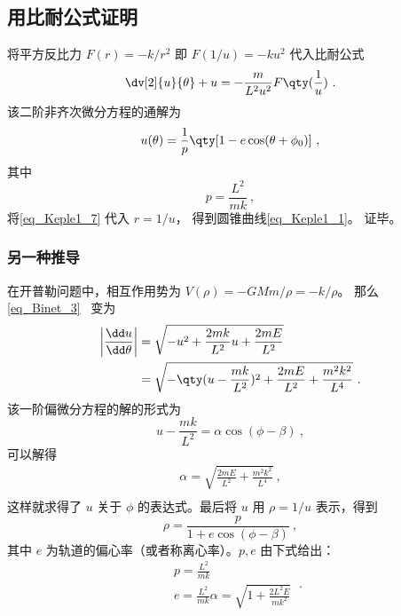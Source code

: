 \subsection{用比耐公式证明}

将平方反比力 $F(r) = -k/r^2$ 即 $F(1/u) = -ku^2$ 代入比耐公式
\begin{equation}
\dv[2]{u}{\theta} + u = -\frac{m}{L^2 u^2} F\qty(\frac 1u)~.
\end{equation}
该二阶非齐次微分方程的通解为
\begin{equation}\label{eq_Keple1_7}
u(\theta) = \frac{1}{p} \qty[1 - e\cos(\theta  + \phi_0)]~,
\end{equation}
其中
\begin{equation}
p = \frac{L^2}{mk}~,
\end{equation}
将\autoref{eq_Keple1_7} 代入 $r = 1/u$， 得到圆锥曲线\autoref{eq_Keple1_1}。 证毕。

\subsubsection{另一种推导}
在开普勒问题中，相互作用势为 $V(\rho)=-GMm/\rho=-k/\rho$。 那么 \autoref{eq_Binet_3}~ 变为
\begin{equation}
\begin{aligned}
\left|\frac{\dd u}{\dd \theta}\right|&=\sqrt{-u^2+\frac{2m k}{L^2}u+\frac{2m E}{L^2}}\\
&=\sqrt{-\qty(u-\frac{m k}{L^2})^2+\frac{2m E}{L^2}+\frac{m^2 k^2}{L^4}}~.
\end{aligned}
\end{equation}
该一阶偏微分方程的解的形式为
\begin{equation}
u-\frac{m k}{L^2}=\alpha\cos(\phi-\beta)~,
\end{equation}
可以解得
\begin{equation}
\begin{aligned}
\alpha=\sqrt{\frac{2m E}{L^2}+\frac{m^2 k^2}{L^4}}~,\\
\end{aligned}
\end{equation}
这样就求得了 $u$ 关于 $\phi$ 的表达式。最后将 $u$ 用 $\rho=1/u$ 表示，得到
\begin{equation}
\rho=\frac{p}{1+e\cos(\phi-\beta)}~,
\end{equation}
其中 $e$ 为轨道的偏心率（或者称离心率）。$p,e$ 由下式给出：
\begin{equation}
\begin{aligned}
&p=\frac{L^2}{m k}\\
&e=\frac{L^2}{m k}\alpha=\sqrt{1+\frac{2L^2E}{m k^2}}
\end{aligned}~.
\end{equation}

